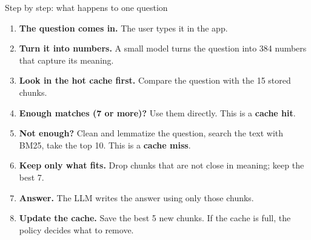 \documentclass[aspectratio=169,11pt]{beamer}
\begin{document}
\begin{frame}{Step by step: what happens to one question}
\small
\begin{enumerate}
  \setlength{\itemsep}{4pt}
  \item \textbf{The question comes in.} The user types it in the app.
  \item \textbf{Turn it into numbers.} A small model turns the question into
        384 numbers that capture its meaning.
  \item \textbf{Look in the hot cache first.} Compare the question with the
        15 stored chunks.
  \item \textbf{Enough matches (7 or more)?} Use them directly. This is a
        \textcolor{cmgreen}{\textbf{cache hit}}.
  \item \textbf{Not enough?} Clean and lemmatize the question, search the text
        with BM25, take the top 10. This is a
        \textcolor{cmhot}{\textbf{cache miss}}.
  \item \textbf{Keep only what fits.} Drop chunks that are not close in
        meaning; keep the best 7.
  \item \textbf{Answer.} The LLM writes the answer using only those chunks.
  \item \textbf{Update the cache.} Save the best 5 new chunks. If the cache
        is full, the policy decides what to remove.
\end{enumerate}
\end{frame}
\end{document}
